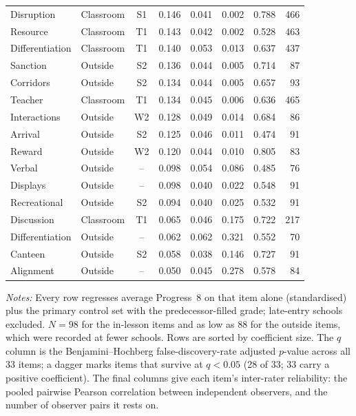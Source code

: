 \begin{table}[htbp]
\begin{tabular}{llcccccr}
Disruption      & Classroom & S1  & 0.146\sym{\dagger} & 0.041 & 0.002    & 0.788 & 466 \\
Resource        & Classroom & T1  & 0.143\sym{\dagger} & 0.042 & 0.002    & 0.528 & 463 \\
Differentiation & Classroom & T1  & 0.140\sym{\dagger} & 0.053 & 0.013    & 0.637 & 437 \\
Sanction        & Outside   & S2  & 0.136\sym{\dagger} & 0.044 & 0.005    & 0.714 & 87  \\
Corridors       & Outside   & S2  & 0.134\sym{\dagger} & 0.044 & 0.005    & 0.657 & 93  \\
Teacher         & Classroom & T1  & 0.134\sym{\dagger} & 0.045 & 0.006    & 0.636 & 465 \\
Interactions    & Outside   & W2  & 0.128\sym{\dagger} & 0.049 & 0.014    & 0.684 & 86  \\
Arrival         & Outside   & S2  & 0.125\sym{\dagger} & 0.046 & 0.011    & 0.474 & 91  \\
Reward          & Outside   & W2  & 0.120\sym{\dagger} & 0.044 & 0.010    & 0.805 & 83  \\
Verbal          & Outside   & --  & 0.098 & 0.054 & 0.086    & 0.485 & 76  \\
Displays        & Outside   & --  & 0.098\sym{\dagger} & 0.040 & 0.022    & 0.548 & 91  \\
Recreational    & Outside   & S2  & 0.094\sym{\dagger} & 0.040 & 0.025    & 0.532 & 91  \\
Discussion      & Classroom & T1  & 0.065 & 0.046 & 0.175    & 0.722 & 217 \\
Differentiation & Outside   & --  & 0.062 & 0.062 & 0.321    & 0.552 & 70  \\
Canteen         & Outside   & S2  & 0.058 & 0.038 & 0.146    & 0.727 & 91  \\
Alignment       & Outside   & --  & 0.050 & 0.045 & 0.278    & 0.578 & 84  \\
\bottomrule
\end{tabular}
\begin{minipage}{\linewidth}
\smallskip
\footnotesize\textit{Notes:} Every row regresses average Progress~8 on that item alone (standardised) plus the primary control set with the predecessor-filled grade; late-entry schools excluded. $N=98$ for the in-lesson items and as low as 88 for the outside items, which were recorded at fewer schools. Rows are sorted by coefficient size. The $q$ column is the Benjamini--Hochberg false-discovery-rate adjusted $p$-value across all 33 items; a dagger marks items that survive at $q<0.05$ (28 of 33; 33 carry a positive coefficient). The final columns give each item's inter-rater reliability: the pooled pairwise Pearson correlation between independent observers, and the number of observer pairs it rests on.
\end{minipage}
\end{table}
